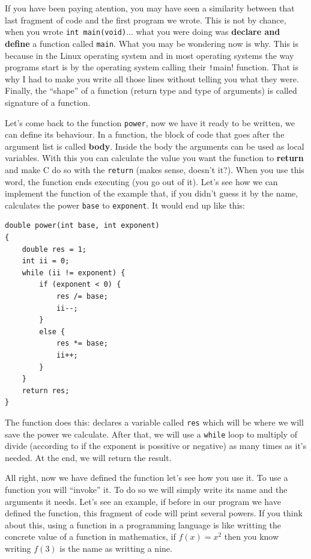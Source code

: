 \documentclass[a4paper]{article}
\begin{document}
If you have been paying atention, you may have seen a similarity between that
last fragment of code and the first program we wrote. This is not by chance,
when you wrote \verb!int main(void)!... what you were doing was \textbf{declare
and define} a function called \verb!main!. What you may be wondering now is why.
This is because in the Linux operating system and in most operating systems
the way programs start is by the operating system calling their \texttt!main!
function. That is why I had to make you write all those lines without telling
you what they were. Finally, the ``shape'' of a function (return type and
type of arguments) is called signature of a function.

Let's come back to the function \verb!power!, now we have it ready to be written,
we can define its behaviour. In a function, the block of code that goes after
the argument list is called \textbf{body}. Inside the body the arguments can
be used as local variables. With this you can calculate the value you want the
function to \textbf{return} and make C do so with the
\lstinline[style=C]{return} (makes sense, doesn't it?). When you use this word,
the function ends executing (you go out of it). Let's see how we can implement
the function of the example that, if you didn't guess it by the name, calculates
the power \verb!base! to \verb!exponent!. It would end up like this:

\noindent
\begin{minipage}[H]{\linewidth}
\mbox{}
\begin{lstlisting}[style=C, label={lst:functionExample},
caption={Example of a function in C}]
double power(int base, int exponent)
{
    double res = 1;
    int ii = 0;
    while (ii != exponent) {
        if (exponent < 0) {
            res /= base;
            ii--;
        }
        else {
            res *= base;
            ii++;
        }
    }
    return res;
}
\end{lstlisting}
\end{minipage}

The function does this: declares a variable called \verb!res! which will be
where we will save the power we calculate. After that, we will use a
\verb!while! loop to multiply of divide (according to if the exponent is
possitive or negative) as many times as it's needed. At the end, we will return
the result.

All right, now we have defined the function let's see how you use it. To use
a function you will ``invoke'' it. To do so we will simply write its name and
the arguments it needs. Let's see an example, if before in our program we
have defined the function, this fragment of code will print several powers.
If you think about this, using a function in a programming language is like
writting the concrete value of a function in mathematics, if $f(x) = x^2$
then you know writing $f(3)$ is the name as writting a nine.
\end{document}
